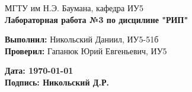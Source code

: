 \documentclass{article}
\begin{document}
\begin{titlepage}
    \begin{center}
        \normalsize
        МГТУ им Н.Э. Баумана, кафедра ИУ5 \\
        \vspace*{1cm}
        \LARGE
        \textbf{Лабораторная работа №3 по дисцилине "РИП"}

        \vspace{0.5cm}
    \end{center}
    \vfill

    \begin{flushright}
        \textbf{Выполнил:} Никольский Даниил, ИУ5-51б \\
        \textbf{Проверил:} Гапанюк Юрий Евгеньевич, ИУ5 \\
    \end{flushright}
    \vspace{1.5cm}
    \begin{flushleft}
        \textbf{Дата: \today} \\
        \textbf{Подпись: Никольский Д.Р.} \\
    \end{flushleft}
\end{titlepage}

\tableofcontents
\newpage
\end{document}
